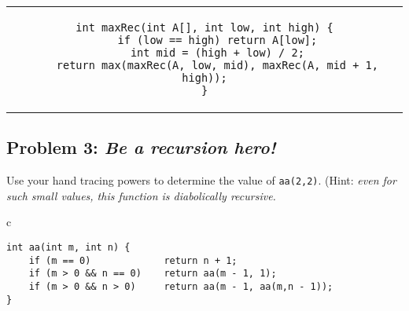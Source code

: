 \documentclass[11 pt]{article}
\begin{document}
\begin{center}
\begin{tabular}{c}
\begin{lstlisting}
int maxRec(int A[], int low, int high) {
    if (low == high) return A[low];
    int mid = (high + low) / 2;
    return max(maxRec(A, low, mid), maxRec(A, mid + 1, high));
}
\end{lstlisting}
\end{tabular}
\end{center}

\subsection{Problem 3: \textit {Be a recursion hero!}}
Use your hand tracing powers to determine the value of \texttt{aa(2,2)}. (Hint: \textit {even for such small values, this function is diabolically recursive.}

\begin{center}
\begin{tabular}{c}
\begin{lstlisting}
int aa(int m, int n) {
    if (m == 0)             return n + 1;
    if (m > 0 && n == 0)    return aa(m - 1, 1);
    if (m > 0 && n > 0)     return aa(m - 1, aa(m,n - 1));
}
\end{lstlisting}
\end{tabular}
\end{center}
\end{document}
